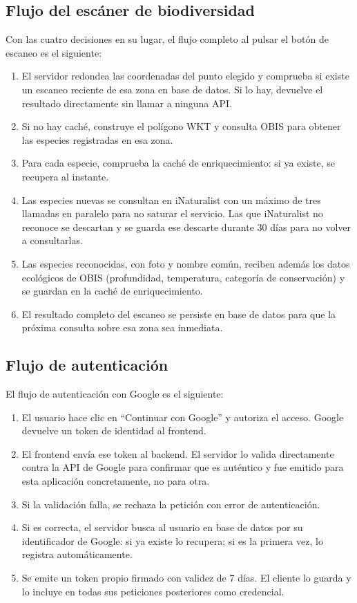 \subsection*{Flujo del escáner de biodiversidad}

Con las cuatro decisiones en su lugar, el flujo completo al pulsar el botón de escaneo es el siguiente:

\begin{enumerate}
    \item El servidor redondea las coordenadas del punto elegido y comprueba si existe un escaneo reciente de esa zona en base de datos. Si lo hay, devuelve el resultado directamente sin llamar a ninguna API.
    \item Si no hay caché, construye el polígono WKT y consulta OBIS para obtener las especies registradas en esa zona.
    \item Para cada especie, comprueba la caché de enriquecimiento: si ya existe, se recupera al instante.
    \item Las especies nuevas se consultan en iNaturalist con un máximo de tres llamadas en paralelo para no saturar el servicio. Las que iNaturalist no reconoce se descartan y se guarda ese descarte durante 30 días para no volver a consultarlas.
    \item Las especies reconocidas, con foto y nombre común, reciben además los datos ecológicos de OBIS (profundidad, temperatura, categoría de conservación) y se guardan en la caché de enriquecimiento.
    \item El resultado completo del escaneo se persiste en base de datos para que la próxima consulta sobre esa zona sea inmediata.
\end{enumerate}

\subsection*{Flujo de autenticación}

El flujo de autenticación con Google es el siguiente:

\begin{enumerate}
    \item El usuario hace clic en ``Continuar con Google'' y autoriza el acceso. Google devuelve un token de identidad al frontend.
    \item El frontend envía ese token al backend. El servidor lo valida directamente contra la API de Google para confirmar que es auténtico y fue emitido para esta aplicación concretamente, no para otra.
    \item Si la validación falla, se rechaza la petición con error de autenticación.
    \item Si es correcta, el servidor busca al usuario en base de datos por su identificador de Google: si ya existe lo recupera; si es la primera vez, lo registra automáticamente.
    \item Se emite un token propio firmado con validez de 7 días. El cliente lo guarda y lo incluye en todas sus peticiones posteriores como credencial.
\end{enumerate}

